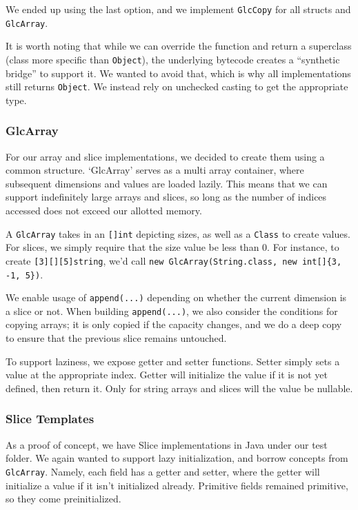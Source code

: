 \documentclass[11pt]{article}
\begin{document}
We ended up using the last option, and we implement \texttt{GlcCopy} for all structs and \texttt{GlcArray}.

It is worth noting that while we can override the function and return a superclass (class more specific than \texttt{Object}),
the underlying bytecode creates a ``synthetic bridge'' to support it.
We wanted to avoid that, which is why all implementations still returns
\texttt{Object}. We instead rely on unchecked casting to get the appropriate type.

\subsubsection{GlcArray}
\label{sec:glcarray}

For our array and slice implementations, we decided to create them using a common structure.
`GlcArray' serves as a multi array container, where subsequent dimensions and values are loaded lazily.
This means that we can support indefinitely large arrays and slices, so long as the number of indices accessed does not exceed our allotted memory.

A \texttt{GlcArray} takes in an \texttt{[]int} depicting sizes, as well as a \texttt{Class} to create values.
For slices, we simply require that the size value be less than 0.
For instance, to create \texttt{[3][][5]string}, we'd call \texttt{new GlcArray(String.class, new int[]\{3, -1, 5\})}.

We enable usage of \texttt{append(...)} depending on whether the current dimension is a slice or not.
When building \texttt{append(...)}, we also consider the conditions for copying arrays; it is only copied if the capacity changes, and we do a deep copy to ensure that the previous slice remains untouched.

To support laziness, we expose getter and setter functions.
Setter simply sets a value at the appropriate index.
Getter will initialize the value if it is not yet defined, then return it.
Only for string arrays and slices will the value be nullable.

\subsubsection{Slice Templates}
\label{sec:slice-template}

As a proof of concept, we have Slice implementations in Java under our test folder.
We again wanted to support lazy initialization, and borrow concepts from \texttt{GlcArray}.
Namely, each field has a getter and setter, where the getter will initialize a value if it isn't initialized already.
Primitive fields remained primitive, so they come preinitialized.
\end{document}
